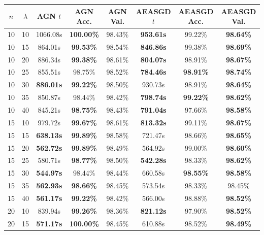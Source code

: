 \begin{table}
  \centering
  \begin{tabular}{|c|c|c|c|c|c|c|c|}
    \hline
    $n$ & $\lambda$ & \textsc{AGN} $t$ & \textsc{AGN} Acc. & \textsc{AGN} Val. & \textsc{AEASGD} $t$ & \textsc{AEASGD} Acc. & \textsc{AEASGD} Val. \\
    \hline
    \hline
10 & 10 & 1066.08s & \textbf{100.00\%} & 98.43\% & \textbf{953.61s} & 99.22\% & \textbf{98.64\%}  \\
\hline
10 & 15 & 864.01s & \textbf{99.53\%} & 98.54\% & \textbf{846.86s} & 99.38\% & \textbf{98.69\%}  \\
\hline
10 & 20 & 886.34s & \textbf{99.38\%} & 98.61\% & \textbf{804.07s} & 98.91\% & \textbf{98.67\%}  \\
\hline
10 & 25 & 855.51s & 98.75\% & 98.52\% & \textbf{784.46s} & \textbf{98.91\%} & \textbf{98.74\%}  \\
\hline
10 & 30 & \textbf{886.01s} & \textbf{99.22\%} & 98.50\% & 930.73s & 98.91\% & \textbf{98.64\%}  \\
\hline
10 & 35 & 850.87s & 98.44\% & 98.42\% & \textbf{798.74s} & \textbf{99.22\%} & \textbf{98.62\%}  \\
\hline
10 & 40 & 845.21s & \textbf{98.75\%} & 98.43\% & \textbf{791.04s} & 97.66\% & \textbf{98.58\%}  \\
\hline
15 & 10 & 979.72s & \textbf{99.67\%} & 98.61\% & \textbf{813.32s} & 99.11\% & \textbf{98.67\%}  \\
\hline
15 & 15 & \textbf{638.13s} & \textbf{99.89\%} & 98.58\% & 721.47s & 98.66\% & \textbf{98.65\%}  \\
\hline
15 & 20 & \textbf{562.72s} & \textbf{99.89\%} & 98.49\% & 564.92s & 99.00\% & \textbf{98.60\%}  \\
\hline
15 & 25 & 580.71s & \textbf{98.77\%} & 98.50\% & \textbf{542.28s} & 98.33\% & \textbf{98.62\%}  \\
\hline
15 & 30 & \textbf{544.97s} & 98.44\% & 98.44\% & 660.58s & \textbf{98.55\%} & \textbf{98.58\%}  \\
\hline
15 & 35 & \textbf{562.93s} & \textbf{98.66\%} & 98.45\% & 573.54s & 98.33\% & 98.45\%  \\
\hline
15 & 40 & \textbf{561.17s} & \textbf{99.22\%} & 98.42\% & 566.00s & 98.88\% & \textbf{98.52\%}  \\
\hline
20 & 10 & 839.94s & \textbf{99.26\%} & 98.36\% & \textbf{821.12s} & 97.90\% & \textbf{98.52\%}  \\
\hline
20 & 15 & \textbf{571.17s} & \textbf{100.00\%} & 98.45\% & 610.88s & 98.52\% & \textbf{98.49\%}  \\

\end{tabular}
\end{table}
